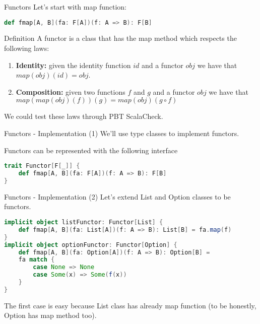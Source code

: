 \begin{frame}[fragile]{Functors}
	Let's start with map function:
\begin{lstlisting}[language=scala]
def fmap[A, B](fa: F[A])(f: A => B): F[B]
\end{lstlisting}
	\pause
	\begin{block}{Definition}
		A functor is a class that has the map method which respects the following laws:
		\begin{enumerate}[<+->]
			\item \textbf{Identity:} given the identity function $id$ and a functor $obj$ we have that $map(obj)(id) = obj$.
			\item \textbf{Composition:} given two functions $f$ and $g$ and a functor $obj$ we have that $map(map(obj)(f))(g) = map(obj)(g \circ f)$
		\end{enumerate}
	\end{block}
	\pause[3]
	We could test these laws through PBT ScalaCheck.
\end{frame}

\begin{frame}[fragile]{Functors - Implementation (1)}	
	We'll use type classes to implement functors.
	
	Functors can be represented with the following interface
\begin{lstlisting}[language=scala]
trait Functor[F[_]] {
	def fmap[A, B](fa: F[A])(f: A => B): F[B]
}
\end{lstlisting}
\end{frame}

\begin{frame}[fragile]{Functors - Implementation (2)}			
Let's extend List and Option classes to be functors.
\begin{lstlisting}[language=scala]
implicit object listFunctor: Functor[List] {
	def fmap[A, B](fa: List[A])(f: A => B): List[B] = fa.map(f)
}
implicit object optionFunctor: Functor[Option] {
	def fmap[A, B](fa: Option[A])(f: A => B): Option[B] = 
	fa match {
		case None => None
		case Some(x) => Some(f(x))	
	}
}			
\end{lstlisting}		
	The first case is easy because List class has already map function
	(to be honestly, Option has map method too).
\end{frame}
	
